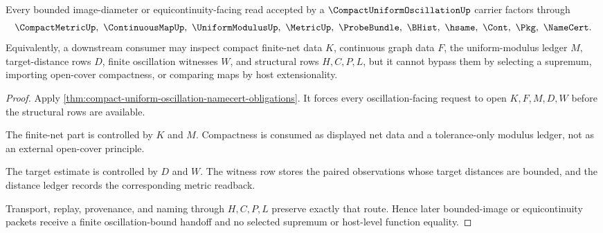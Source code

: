 \begin{theorem}
\label{thm:compact-uniform-oscillation-modulus-handoff}
Every bounded image-diameter or equicontinuity-facing read accepted by a $\CompactUniformOscillationUp$ carrier factors through
$$
\CompactMetricUp,\ \ContinuousMapUp,\ \UniformModulusUp,\ \MetricUp,\ \ProbeBundle,\ \BHist,\ \hsame,\ \Cont,\ \Pkg,\ \NameCert .
$$
Equivalently, a downstream consumer may inspect compact finite-net data $K$, continuous graph data $F$, the uniform-modulus ledger $M$, target-distance rows $D$, finite oscillation witnesses $W$, and structural rows $H,C,P,L$, but it cannot bypass them by selecting a supremum, importing open-cover compactness, or comparing maps by host extensionality.
\end{theorem}
\begin{proof}
Apply \autoref{thm:compact-uniform-oscillation-namecert-obligations}. It forces every oscillation-facing request to open $K,F,M,D,W$ before the structural rows are available.

The finite-net part is controlled by $K$ and $M$. Compactness is consumed as displayed net data and a tolerance-only modulus ledger, not as an external open-cover principle.

The target estimate is controlled by $D$ and $W$. The witness row stores the paired observations whose target distances are bounded, and the distance ledger records the corresponding metric readback.

Transport, replay, provenance, and naming through $H,C,P,L$ preserve exactly that route. Hence later bounded-image or equicontinuity packets receive a finite oscillation-bound handoff and no selected supremum or host-level function equality.
\end{proof}



